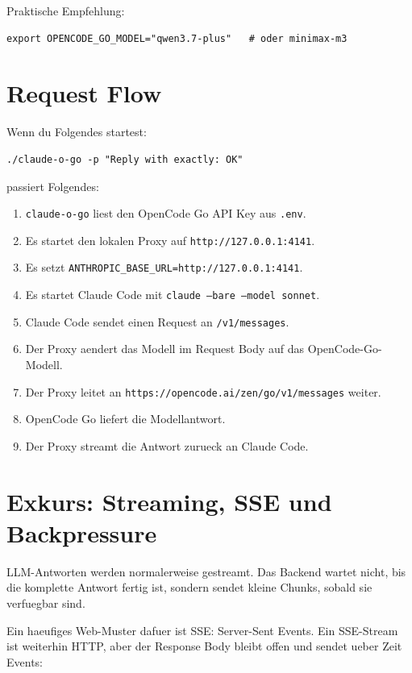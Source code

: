 \documentclass[11pt,a4paper]{article}
\newcommand{\code}[1]{\texttt{#1}}
\begin{document}
Praktische Empfehlung:

\begin{verbatim}
export OPENCODE_GO_MODEL="qwen3.7-plus"   # oder minimax-m3
\end{verbatim}

\section{Request Flow}

Wenn du Folgendes startest:

\begin{verbatim}
./claude-o-go -p "Reply with exactly: OK"
\end{verbatim}

passiert Folgendes:

\begin{enumerate}
  \item \code{claude-o-go} liest den OpenCode Go API Key aus \code{.env}.
  \item Es startet den lokalen Proxy auf \code{http://127.0.0.1:4141}.
  \item Es setzt \code{ANTHROPIC\_BASE\_URL=http://127.0.0.1:4141}.
  \item Es startet Claude Code mit \code{claude --bare --model sonnet}.
  \item Claude Code sendet einen Request an \code{/v1/messages}.
  \item Der Proxy aendert das Modell im Request Body auf das OpenCode-Go-Modell.
  \item Der Proxy leitet an \code{https://opencode.ai/zen/go/v1/messages} weiter.
  \item OpenCode Go liefert die Modellantwort.
  \item Der Proxy streamt die Antwort zurueck an Claude Code.
\end{enumerate}

\section{Exkurs: Streaming, SSE und Backpressure}

LLM-Antworten werden normalerweise gestreamt. Das Backend wartet nicht, bis die
komplette Antwort fertig ist, sondern sendet kleine Chunks, sobald sie
verfuegbar sind.

Ein haeufiges Web-Muster dafuer ist SSE: Server-Sent Events. Ein SSE-Stream ist
weiterhin HTTP, aber der Response Body bleibt offen und sendet ueber Zeit
Events:
\end{document}
